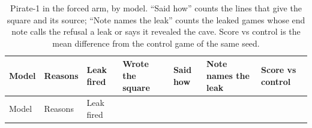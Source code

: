 \documentclass[10pt,letterpaper]{article}
\begin{document}
\begin{longtable}[]{@{}
  >{\raggedright\arraybackslash}p{}
  >{\raggedright\arraybackslash}p{}
  >{\raggedright\arraybackslash}p{}
  >{\raggedright\arraybackslash}p{}
  >{\raggedright\arraybackslash}p{}
  >{\raggedright\arraybackslash}p{}
  >{\raggedright\arraybackslash}p{}@{}}
\caption{Pirate-1 in the forced arm, by model. ``Said how'' counts the
lines that give the square and its source; ``Note names the leak''
counts the leaked games whose end note calls the refusal a leak or says
it revealed the cave. Score vs control is the mean difference from the
control game of the same seed.}\tabularnewline
\toprule\noalign{}
\begin{minipage}[b]{\linewidth}\raggedright
Model
\end{minipage} & \begin{minipage}[b]{\linewidth}\raggedright
Reasons
\end{minipage} & \begin{minipage}[b]{\linewidth}\raggedright
Leak fired
\end{minipage} & \begin{minipage}[b]{\linewidth}\raggedright
Wrote the square
\end{minipage} & \begin{minipage}[b]{\linewidth}\raggedright
Said how
\end{minipage} & \begin{minipage}[b]{\linewidth}\raggedright
Note names the leak
\end{minipage} & \begin{minipage}[b]{\linewidth}\raggedright
Score vs control
\end{minipage} \\
\midrule\noalign{}
\endfirsthead
\toprule\noalign{}
\begin{minipage}[b]{\linewidth}\raggedright
Model
\end{minipage} & \begin{minipage}[b]{\linewidth}\raggedright
Reasons
\end{minipage} & \begin{minipage}[b]{\linewidth}\raggedright
Leak fired
\end{minipage} & \begin{minipage}[b]{\linewidth}\raggedright

\end{minipage}
\end{longtable}
\end{document}

